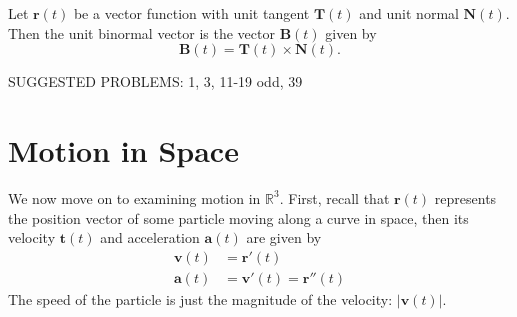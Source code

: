 \documentclass[10pt,]{book}
\theoremstyle{ptxplainnotitle}
\theoremstyle{ptxplaintitle}
\theoremstyle{ptxplainnotitle}
\theoremstyle{ptxplaintitle}
\theoremstyle{ptxplainnotitle}
\theoremstyle{ptxplaintitle}
\theoremstyle{ptxdefinitionnotitle}
\theoremstyle{ptxdefinitiontitle}
\theoremstyle{ptxdefinitionnotitle}
\theoremstyle{ptxdefinitiontitle}
\theoremstyle{ptxdefinitionnotitle}
\theoremstyle{ptxdefinitiontitle}
\theoremstyle{ptxdefinitionnotitle}
\theoremstyle{ptxdefinitiontitle}
\theoremstyle{ptxdefinitionnotitle}
\theoremstyle{ptxdefinitiontitle}
\numberwithin{equation}{section}
\newcommand{\RR}{\mathbb{R}}
\newcommand{\vv}[1]{\mathbf{#1}}
\begin{document}
\begin{definition}\label{definition-binormal-vector}
\hypertarget{p-962}{}%
Let \(\vv{r}(t)\) be a vector function with unit tangent \(\vv{T}(t)\) and unit normal \(\vv{N}(t)\). Then the unit binormal vector is the vector \(\vv{B}(t)\) given by%
%
\begin{equation*}
\vv{B}(t) = \vv{T}(t)\times\vv{N}(t).
\end{equation*}
\end{definition}
\hypertarget{p-963}{}%
SUGGESTED PROBLEMS: 1, 3, 11-19 odd, 39%
\typeout{************************************************}
\typeout{************************************************}
\section[{Motion in Space}]{Motion in Space}\label{section-motion-in-space}
\hypertarget{p-964}{}%
We now move on to examining motion in \(\RR^{3}\). First, recall that \(\vv{r}(t)\) represents the position vector of some particle moving along a curve in space, then its velocity \(\vv{t}(t)\) and acceleration \(\vv{a}(t)\) are given by%
%
\begin{align*}
\vv{v}(t) & = \vv{r}'(t) \\
\vv{a}(t) & = \vv{v}'(t) = \vv{r}''(t) 
\end{align*}
\hypertarget{p-965}{}%
The speed of the particle is just the magnitude of the velocity: \(|\vv{v}(t)|\).%
\end{document}
